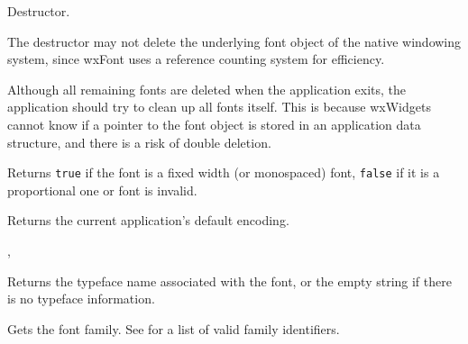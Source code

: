 Destructor.


The destructor may not delete the underlying font object of the native windowing
system, since wxFont uses a reference counting system for efficiency.

Although all remaining fonts are deleted when the application exits,
the application should try to clean up all fonts itself. This is because
wxWidgets cannot know if a pointer to the font object is stored in an
application data structure, and there is a risk of double deletion.


\label{wxfontisfixedwidth}


Returns {\tt true} if the font is a fixed width (or monospaced) font,
{\tt false} if it is a proportional one or font is invalid.


\label{wxfontgetdefaultencoding}


Returns the current application's default encoding.


,


\label{wxfontgetfacename}


Returns the typeface name associated with the font, or the empty string if there is no
typeface information.




\label{wxfontgetfamily}


Gets the font family. See  for a list of valid
family identifiers.




\label{wxfontgetnativefontinfodesc}


